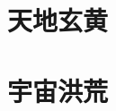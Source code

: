\documentclass[UTF8]{ctexart}
\begin{document}
\section{天地玄黄}
\newpage
\section{宇宙洪荒}
\end{document}
